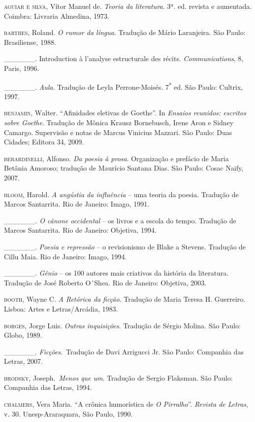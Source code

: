 \begin{hangparas}{.35in}{1}
\textsc{aguiar e silva}, Vítor Manuel de. \emph{Teoria da literatura}.
3ª. ed. revista e aumentada. Coimbra: Livraria Almedina, 1973.

\textsc{barthes}, Roland. \emph{O rumor da língua}. Tradução de Mário
Laranjeira. São Paulo: Brasiliense, 1988.

\_\_\_\_\_\_. Introduction à l'analyse estructurale des récits.
\emph{Communications}, 8, Paris, 1996.

\textsc{\_\_\_\_\_\_}. \emph{Aula}. Tradução de Leyla Perrone-Moisés.
7\textsuperscript{ª} ed. São Paulo: Cultrix, 1997.

\textsc{benjamin, W}alter. ``Afinidades eletivas de Goethe''. In
\emph{Ensaios reunidos: escritos sobre Goethe}. Tradução de Mônica
Krausz Bornebusch, Irene Aron e Sidney Camargo. Supervisão e notas de
Marcus Vinicius Mazzari. São Paulo: Duas Cidades; Editora 34, 2009.

\textsc{berardinelli}, Alfonso. \emph{Da poesia à prosa}. Organização e
prefácio de Maria Betânia Amoroso; tradução de Maurício Santana Dias.
São Paulo: Cosac Naify, 2007.

\textsc{bloom}, Harold. \emph{A angústia da influência} -- uma teoria da
poesia. Tradução de Marcos Santarrita. Rio de Janeiro: Imago, 1991.

\textsc{\_\_\_\_\_\_}\emph{. O cânone occidental} -- os livros e a
escola do tempo. Tradução de Marcos Santarrita. Rio de Janeiro:
Objetiva, 1994.

\_\_\_\_\_\_. \emph{Poesia e repressão} -- o revisionismo de Blake a
Stevens. Tradução de Cillu Maia. Rio de Janeiro: Imago, 1994.

\_\_\_\_\_\_. \emph{Gênio} -- os 100 autores mais criativos da história
da literatura. Tradução de José Roberto O´Shea. Rio de Janeiro:
Objetiva, 2003.

\textsc{booth}, Wayne C. \emph{A Retórica da ficção}. Tradução de Maria Teresa H. Guerreiro. Lisboa: Artes e Letras/Arcádia, 1983.

\textsc{borges}, Jorge Luis. \emph{Outras inquisições}. Tradução de
Sérgio Molina. São Paulo: Globo, 1989.

\textsc{\_\_\_\_\_\_}. \emph{Ficções}.~Tradução de Davi Arrigucci Jr. São Paulo: Companhia das Letras, 2007.

\textsc{brodsky}, Joseph.~\emph{Menos que um}. Tradução de Sergio Flaksman. São Paulo: Companhia das Letras, 1994.

\textsc{chalmers}, Vera Maria. ``A crônica humorística de \emph{O Pirralho}''.
\emph{Revista de Letras}, v. 30. Unesp-Araraquara, São Paulo, 1990.


\end{hangparas}
